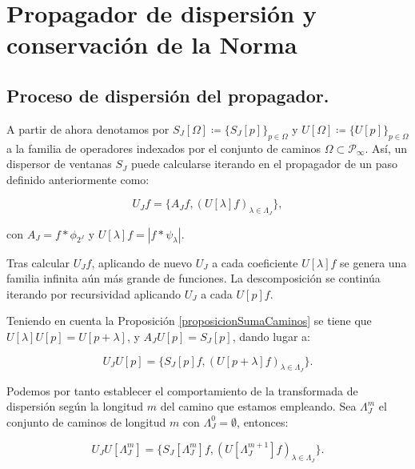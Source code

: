 \section{Propagador de dispersión y conservación de la Norma} \label{ch:seccion13}


\subsection{Proceso de dispersión del propagador.}

\noindent A partir de ahora denotamos por $S_J[\Omega] \coloneqq \lbrace S_J[p] \rbrace_{p\in\Omega}$ y $U[\Omega]\coloneqq \lbrace U[p] \rbrace_{p\in\Omega}$ a la familia de operadores indexados por el conjunto de caminos $\Omega \subset \mathcal{P}_\infty$. Así, un dispersor de ventanas $S_J$ puede calcularse iterando en el propagador de un paso definido anteriormente como: 

$$U_Jf=\lbrace A_Jf, (U[\lambda]f)_{\lambda\in\Lambda_J} \rbrace,$$

\noindent con $A_J=f\ast \phi_{2^J}$ y $U[\lambda]f=\left| f\ast \psi_\lambda \right|$. 

\medskip

\noindent Tras calcular $U_Jf$, aplicando de nuevo $U_J$ a cada coeficiente $U[\lambda]f$ se genera una familia infinita aún más grande de funciones. La descomposición se continúa iterando  por recursividad aplicando $U_J$ a cada $U[p]f$. 

\medskip

\noindent Teniendo en cuenta la Proposición \ref{proposicionSumaCaminos} se tiene que  $U[\lambda]U[p]=U[p+\lambda]$, y $A_JU[p]=S_J[p]$, dando lugar a: 

\begin{equation}
  U_J U[p]=\lbrace S_J[p]f,(U[p+\lambda]f)_{\lambda\in\Lambda_J}\rbrace. 
\end{equation}



\medskip

\noindent Podemos por tanto establecer el comportamiento de la transformada de dispersión según la longitud $m$ del camino que estamos empleando. Sea $\Lambda_J^m$ el conjunto de caminos de longitud $m$ con $\Lambda_J^0={\emptyset}$, entonces:


\begin{equation} \label{eq::1.5}
  U_J U[\Lambda_J^m]=\lbrace S_J[\Lambda_J^m]f,(U[\Lambda_J^{m+1}]f)_{\lambda\in\Lambda_J}\rbrace.
\end{equation}

